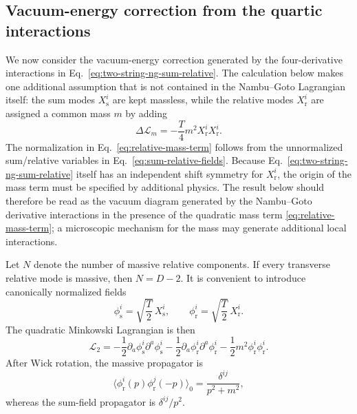 \subsection{Vacuum-energy correction from the quartic interactions}
\label{subsec:vacuum-energy-correction}

We now consider the vacuum-energy correction generated by the four-derivative
interactions in Eq.~\eqref{eq:two-string-ng-sum-relative}.  The calculation
below makes one additional assumption that is not contained in the
Nambu--Goto Lagrangian itself: the sum modes $X_{\mathrm{s}}^i$ are kept
massless, while the relative modes $X_{\mathrm{r}}^i$ are assigned a common
mass $m$ by adding
\begin{equation}
  \Delta\mathcal L_m
  = -\frac{T}{4}m^2 X_{\mathrm r}^i X_{\mathrm r}^i .
  \label{eq:relative-mass-term}
\end{equation}
The normalization in Eq.~\eqref{eq:relative-mass-term} follows from the
unnormalized sum/relative variables in Eq.~\eqref{eq:sum-relative-fields}.
Because Eq.~\eqref{eq:two-string-ng-sum-relative} itself has an independent
shift symmetry for $X_{\mathrm r}^i$, the origin of the mass term must be
specified by additional physics.  The result below should therefore be read
as the vacuum diagram generated by the Nambu--Goto derivative interactions in
the presence of the quadratic mass term \eqref{eq:relative-mass-term}; a
microscopic mechanism for the mass may generate additional local interactions.

Let $N$ denote the number of massive relative components.  If every transverse
relative mode is massive, then $N=D-2$.  It is convenient to introduce
canonically normalized fields
\begin{equation}
  \phi_{\mathrm s}^i = \sqrt{\frac{T}{2}}\,X_{\mathrm s}^i,
  \qquad
  \phi_{\mathrm r}^i = \sqrt{\frac{T}{2}}\,X_{\mathrm r}^i .
  \label{eq:canonical-sr-fields}
\end{equation}
The quadratic Minkowski Lagrangian is then
\begin{equation}
  \mathcal L_2
  = -\frac12 \partial_a\phi_{\mathrm s}^i\partial^a\phi_{\mathrm s}^i
    -\frac12 \partial_a\phi_{\mathrm r}^i\partial^a\phi_{\mathrm r}^i
    -\frac12 m^2\phi_{\mathrm r}^i\phi_{\mathrm r}^i .
  \label{eq:quadratic-canonical-massive-relative}
\end{equation}
After Wick rotation, the massive propagator is
\begin{equation}
  \langle \phi_{\mathrm r}^i(p)\phi_{\mathrm r}^j(-p)\rangle_0
  = \frac{\delta^{ij}}{p^2+m^2},
  \label{eq:massive-relative-propagator}
\end{equation}
whereas the sum-field propagator is $\delta^{ij}/p^2$.

